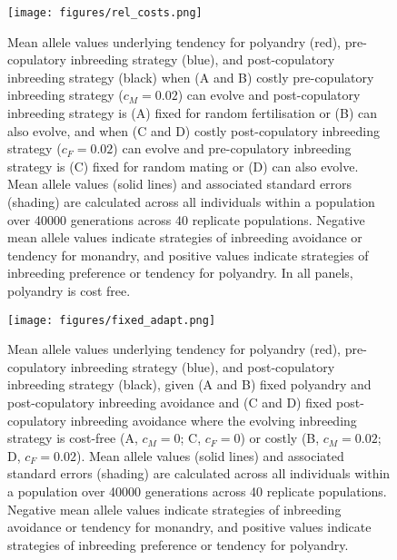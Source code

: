 \documentclass[12pt]{article}
\begin{document}
\clearpage
\begin{figure}
\begin{center}				
\texttt{[image: figures/rel\_costs.png]}
\end{center}
\caption{Mean allele values underlying tendency for polyandry (red), pre-copulatory inbreeding strategy (blue), and post-copulatory inbreeding strategy (black) when (A and B) costly pre-copulatory inbreeding strategy ($c_{M} = 0.02$) can evolve and post-copulatory inbreeding strategy is (A) fixed for random fertilisation or (B) can also evolve, and when (C and D) costly post-copulatory inbreeding strategy ($c_{F} = 0.02$) can evolve and pre-copulatory inbreeding strategy is (C) fixed for random mating or (D) can also evolve. Mean allele values (solid lines) and associated standard errors (shading) are calculated across all individuals within a population over 40000 generations across 40 replicate populations. Negative mean allele values indicate strategies of inbreeding avoidance or tendency for monandry, and positive values indicate strategies of inbreeding preference or tendency for polyandry. In all panels, polyandry is cost free.}
\end{figure}

\clearpage
\begin{figure}
\begin{center}				
\texttt{[image: figures/fixed\_adapt.png]}
\end{center}
\caption{Mean allele values underlying tendency for polyandry (red), pre-copulatory inbreeding strategy (blue), and post-copulatory inbreeding strategy (black), given (A and B) fixed polyandry and post-copulatory inbreeding avoidance and (C and D) fixed post-copulatory inbreeding avoidance where the evolving inbreeding strategy is cost-free (A, $c_{M} = 0$; C, $c_{F} = 0$) or costly (B, $c_{M}=0.02$; D, $c_{F}=0.02$). Mean allele values (solid lines) and associated standard errors (shading) are calculated across all individuals within a population over 40000 generations across 40 replicate populations. Negative mean allele values indicate strategies of inbreeding avoidance or tendency for monandry, and positive values indicate strategies of inbreeding preference or tendency for polyandry.}
\end{figure}
\end{document}
